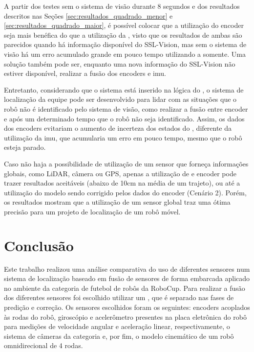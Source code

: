 \documentclass[acronym, symbols, table]{fei}
\begin{document}
		A partir dos testes sem o sistema de visão durante 8 segundos e dos resultados descritos nas Seções \ref{sec:resultados_quadrado_menor} e \ref{sec:resultados_quadrado_maior}, é possível colocar que a utilização do encoder seja mais benéfica do que a utilização da , visto que os resultados de ambas são parecidos quando há informação disponível do SSL-Vision, mas sem o sistema de visão há um erro acumulado grande em pouco tempo utilizando a  somente. Uma solução também pode ser, enquanto uma nova informação do SSL-Vision não estiver disponível, realizar a fusão dos encoders e \acrshort{imu}.
		
		Entretanto, considerando que o sistema está inserido na lógica do , o sistema de localização da equipe pode ser desenvolvido para lidar com as situações que o robô não é identificado pelo sistema de visão, como realizar a fusão entre encoder e  após um determinado tempo que o robô não seja identificado. Assim, os dados dos encoders evitariam o aumento de incerteza dos estados do , diferente da utilização da \acrshort{imu}, que acumularia um erro em pouco tempo, mesmo que o robô esteja parado.
		
		Caso não haja a possibilidade de utilização de um sensor que forneça informações globais, como LiDAR, câmera ou GPS, apenas a utilização de  e encoder pode trazer resultados aceitáveis (abaixo de 10cm na média de um trajeto), ou até a utilização do modelo sendo corrigido pelos dados do encoder (Cenário 2). Porém, os resultados mostram que a utilização de um sensor global traz uma ótima precisão para um projeto de localização de um robô móvel.

\chapter{Conclusão} \label{sec:conclusao}

	Este trabalho realizou uma análise comparativa do uso de diferentes sensores num sistema de localização baseado em fusão de sensores de forma embarcada aplicado no ambiente da categoria  de futebol de robôs da RoboCup. Para realizar a fusão dos diferentes sensores foi escolhido utilizar um , que é separado nas fases de predição e correção. Os sensores escolhidos foram os seguintes: encoders acoplados às rodas do robô, giroscópio e acelerômetro presentes na placa eletrônica do robô para medições de velocidade angular e aceleração linear, respectivamente, o sistema de câmeras da categoria  e, por fim, o modelo cinemático de um robô omnidirecional de 4 rodas.
	
\end{document}
